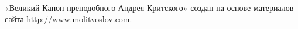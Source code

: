 \vspace*{0.2\paperheight}

\renewcommand\myid{announce}

\begin{identity}

«Великий Канон преподобного Андрея Критского» создан на основе материалов сайта \url{http://www.molitvoslov.com}.

\end{identity}

